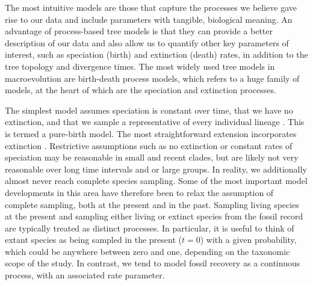 \documentclass[11pt]{article}
\begin{document}
The most intuitive models are those that capture the processes we believe gave rise to our data and include parameters with tangible, biological meaning.
An advantage of process-based tree models is that they can provide a better description of our data and also allow us to quantify other key parameters of interest, such as speciation (birth) and extinction (death) rates, in addition to the tree topology and divergence times. %
The most widely used tree models in macroevolution are birth-death process models, which refers to a huge family of models, at the heart of which are the speciation and extinction processes. 

The simplest model assumes speciation is constant over time, that we have no extinction, and that we sample a representative of every individual lineage \cite{Yule1925}.
This is termed a pure-birth model.
The most straightforward extension incorporates  extinction \cite{Kendall1948}.
Restrictive assumptions such as no extinction or constant rates of speciation may be reasonable in small and recent clades, but are likely not very reasonable over long time intervals and or large groups.
In reality, we additionally almost never reach complete species sampling.
Some of the most important model developments in this area have therefore been to relax the assumption of complete sampling, both at the present and in the past.
Sampling living species at the present and sampling either living or extinct species from the fossil record are typically treated as distinct processes.
In particular, it is useful to think of extant species as being sampled in the present ($t=0$) with a given probability, which could be anywhere between zero and one, depending on the taxonomic scope of the study.
In contrast, we tend to model fossil recovery as a continuous process, with an associated rate parameter.  
\end{document}
